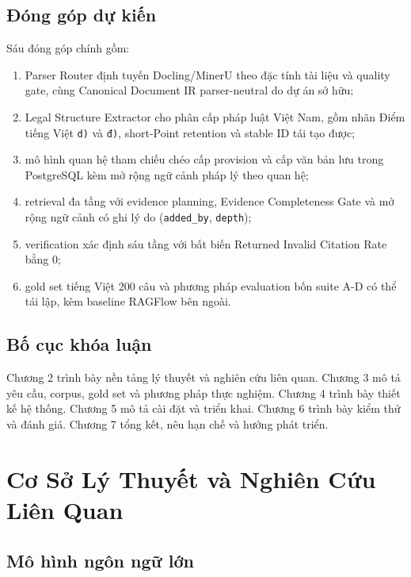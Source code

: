 \documentclass[a4paper,12pt]{extreport}
\newcommand{\code}[1]{\texttt{#1}}
\begin{document}
\section{Đóng góp dự kiến}

Sáu đóng góp chính gồm:

\begin{enumerate}
  \item Parser Router định tuyến Docling/MinerU theo đặc tính tài liệu và quality gate, cùng Canonical Document IR parser-neutral do dự án sở hữu;
  \item Legal Structure Extractor cho phân cấp pháp luật Việt Nam, gồm nhãn Điểm tiếng Việt \code{d)} và \code{đ)}, short-Point retention và stable ID tái tạo được;
  \item mô hình quan hệ tham chiếu chéo cấp provision và cấp văn bản lưu trong PostgreSQL kèm mở rộng ngữ cảnh pháp lý theo quan hệ;
  \item retrieval đa tầng với evidence planning, Evidence Completeness Gate và mở rộng ngữ cảnh có ghi lý do (\code{added\_by}, \code{depth});
  \item verification xác định sáu tầng với bất biến Returned Invalid Citation Rate bằng 0;
  \item gold set tiếng Việt 200 câu và phương pháp evaluation bốn suite A-D có thể tái lập, kèm baseline RAGFlow bên ngoài.
\end{enumerate}

\section{Bố cục khóa luận}

Chương 2 trình bày nền tảng lý thuyết và nghiên cứu liên quan. Chương 3 mô tả yêu cầu, corpus, gold set và phương pháp thực nghiệm. Chương 4 trình bày thiết kế hệ thống. Chương 5 mô tả cài đặt và triển khai. Chương 6 trình bày kiểm thử và đánh giá. Chương 7 tổng kết, nêu hạn chế và hướng phát triển.

\chapter{Cơ Sở Lý Thuyết và Nghiên Cứu Liên Quan}

\section{Mô hình ngôn ngữ lớn}
\end{document}

